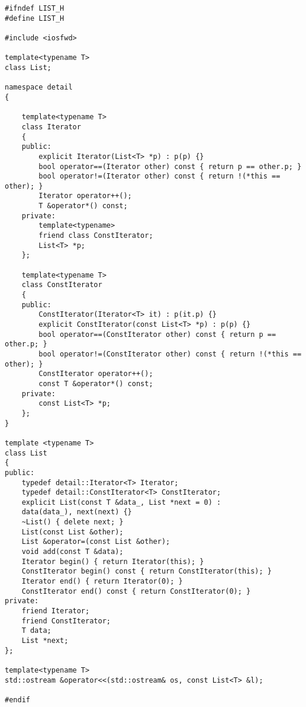 \documentclass[a4paper,11.5pt]{article}
\begin{document}
\begin{lstlisting}
#ifndef LIST_H
#define LIST_H

#include <iosfwd>

template<typename T>
class List;

namespace detail 
{
	
	template<typename T>
	class Iterator
	{
	public:
		explicit Iterator(List<T> *p) : p(p) {}
		bool operator==(Iterator other) const { return p == other.p; }
		bool operator!=(Iterator other) const { return !(*this == other); }
		Iterator operator++();
		T &operator*() const;
	private:
		template<typename>
		friend class ConstIterator;
		List<T> *p;
	};
	
	template<typename T>
	class ConstIterator
	{
	public:
		ConstIterator(Iterator<T> it) : p(it.p) {}
		explicit ConstIterator(const List<T> *p) : p(p) {}
		bool operator==(ConstIterator other) const { return p == other.p; }
		bool operator!=(ConstIterator other) const { return !(*this == other); }
		ConstIterator operator++();
		const T &operator*() const;
	private:
		const List<T> *p;
	};	
}

template <typename T>
class List 
{
public:
	typedef detail::Iterator<T> Iterator;
	typedef detail::ConstIterator<T> ConstIterator;
	explicit List(const T &data_, List *next = 0) :
	data(data_), next(next) {}
	~List() { delete next; }
	List(const List &other);
	List &operator=(const List &other);
	void add(const T &data);
	Iterator begin() { return Iterator(this); }
	ConstIterator begin() const { return ConstIterator(this); }
	Iterator end() { return Iterator(0); }
	ConstIterator end() const { return ConstIterator(0); }
private:
	friend Iterator;
	friend ConstIterator;
	T data;
	List *next;
};

template<typename T>
std::ostream &operator<<(std::ostream& os, const List<T> &l);

#endif
\end{lstlisting}
\end{document}

